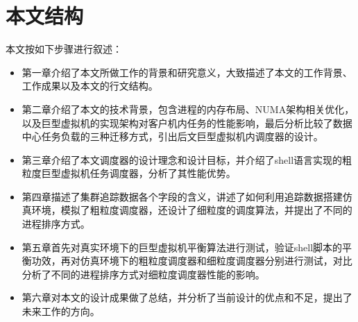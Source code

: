 \section{本文结构}
本文按如下步骤进行叙述：
\begin{itemize}
  \item 第一章介绍了本文所做工作的背景和研究意义，大致描述了本文的工作背景、工作成果以及本文的行文结构。
  \item 第二章介绍了本文的技术背景，包含进程的内存布局、NUMA架构相关优化，以及巨型虚拟机的实现架构对客户机内任务的性能影响，最后分析比较了数据中心任务负载的三种迁移方式，引出后文巨型虚拟机内调度器的设计。
  \item 第三章介绍了本文调度器的设计理念和设计目标，并介绍了shell语言实现的粗粒度巨型虚拟机任务调度器，分析了其性能优势。
  \item 第四章描述了集群追踪数据各个字段的含义，讲述了如何利用追踪数据搭建仿真环境，模拟了粗粒度调度器，还设计了细粒度的调度算法，并提出了不同的进程排序方式。
  \item 第五章首先对真实环境下的巨型虚拟机平衡算法进行测试，验证shell脚本的平衡功效，再对仿真环境下的粗粒度调度器和细粒度调度器分别进行测试，对比分析了不同的进程排序方式对细粒度调度器性能的影响。
  \item 第六章对本文的设计成果做了总结，并分析了当前设计的优点和不足，提出了未来工作的方向。
\end{itemize}
